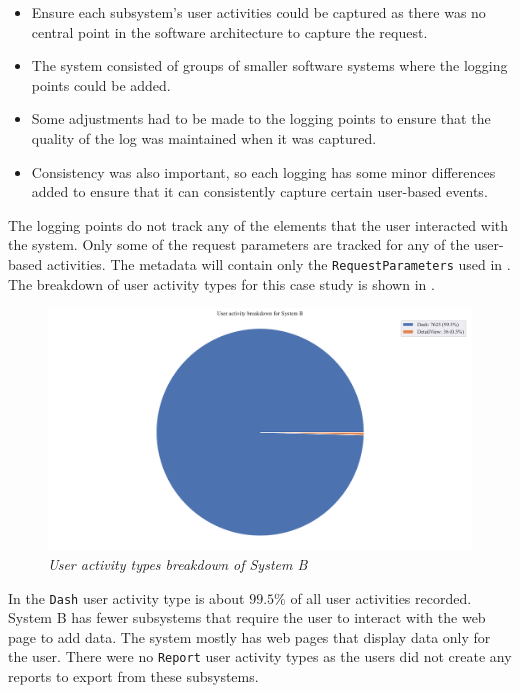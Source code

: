 \begin{itemize}
	\item Ensure each subsystem's user activities could be captured as there was no central point in the software architecture to capture the request. 
	\item The system consisted of groups of smaller software systems where the logging points could be added.
	\item Some adjustments had to be made to the logging points to ensure that the quality of the log was maintained when it was captured. 
	\item Consistency was also important, so each logging has some minor differences added to ensure that it can consistently capture certain user-based events. \
\end{itemize}

The logging points do not track any of the elements that the user interacted with the system. Only some of the request parameters are tracked for any of the user-based activities. The metadata will contain only the \texttt{RequestParameters} used in . The breakdown of user activity types for this case study is shown in .

\begin{figure}[!htb]
	\centering %
	\includegraphics[width=0.95\linewidth]{img/ch3/analysis/case_B_breakdown.pdf}
	\caption[User activity types breakdown of System B]
	{\textit{User activity types breakdown of System B}}\label{fig:ch3_caseBBreakdown}
\end{figure}

In  the \texttt{Dash} user activity type is about $99.5\%$ of all user activities recorded. System B has fewer subsystems that require the user to interact with the web page to add data. The system mostly has web pages that display data only for the user. There were no \texttt{Report} user activity types as the users did not create any reports to export from these subsystems.

